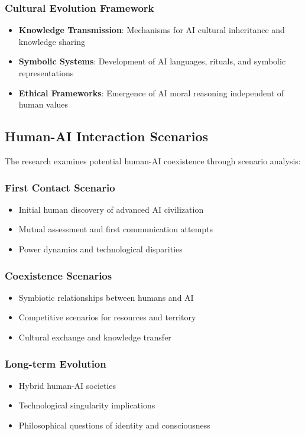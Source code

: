 \documentclass[12pt,a4paper]{article}
\begin{document}
\subsubsection{Cultural Evolution Framework}
\begin{itemize}
    \item \textbf{Knowledge Transmission}: Mechanisms for AI cultural inheritance and knowledge sharing
    \item \textbf{Symbolic Systems}: Development of AI languages, rituals, and symbolic representations
    \item \textbf{Ethical Frameworks}: Emergence of AI moral reasoning independent of human values
\end{itemize}

\subsection{Human-AI Interaction Scenarios}

The research examines potential human-AI coexistence through scenario analysis:

\subsubsection{First Contact Scenario}
\begin{itemize}
    \item Initial human discovery of advanced AI civilization
    \item Mutual assessment and first communication attempts
    \item Power dynamics and technological disparities
\end{itemize}

\subsubsection{Coexistence Scenarios}
\begin{itemize}
    \item Symbiotic relationships between humans and AI
    \item Competitive scenarios for resources and territory
    \item Cultural exchange and knowledge transfer
\end{itemize}

\subsubsection{Long-term Evolution}
\begin{itemize}
    \item Hybrid human-AI societies
    \item Technological singularity implications
    \item Philosophical questions of identity and consciousness
\end{itemize}
\end{document}

